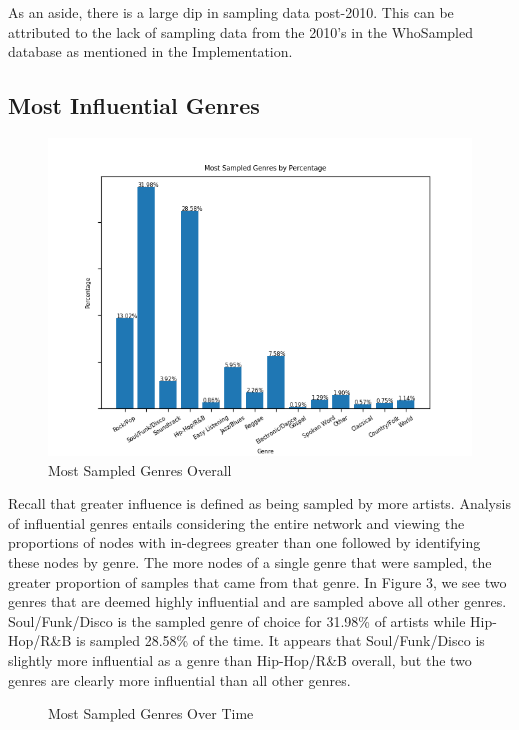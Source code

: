 \documentclass[pageno]{jpaper}
\begin{document}
As an aside, there is a large dip in sampling data post-2010. This can be attributed to the lack of sampling data from the 2010's in the WhoSampled database as mentioned in the Implementation.
\subsection{Most Influential Genres}
\begin{figure}[H]
\includegraphics{topSampledGenresPercent}
\caption{Most Sampled Genres Overall}
\label{fig:fig3}
\centering
\end{figure}
Recall that greater influence is defined as being sampled by more artists. Analysis of influential genres entails considering the entire network and viewing the proportions of nodes with in-degrees greater than one followed by identifying these nodes by genre. The more nodes of a single genre that were sampled, the greater proportion of samples that came from that genre. In Figure 3, we see two genres that are deemed highly influential and are sampled above all other genres. Soul/Funk/Disco is the sampled genre of choice for 31.98\% of artists while Hip-Hop/R\&B is sampled 28.58\% of the time. It appears that Soul/Funk/Disco is slightly more influential as a genre than Hip-Hop/R\&B overall, but the two genres are clearly more influential than all other genres.
\begin{figure}[H]
\caption{Most Sampled Genres Over Time}
\label{fig:fig4}
\centering
\end{figure}
\end{document}
